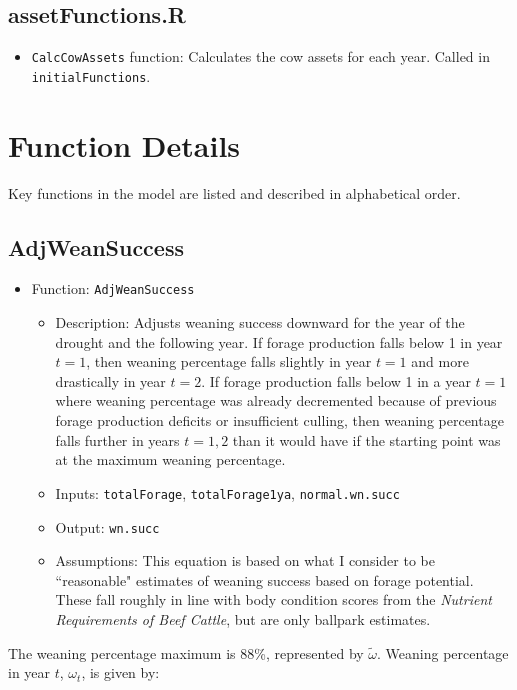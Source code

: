 \documentclass[11pt]{article}
\begin{document}
\subsection{assetFunctions.R}
\begin{itemize}
	\item \verb!CalcCowAssets! function: Calculates the cow assets for each year. Called in \verb!initialFunctions!.
\end{itemize}


\section{Function Details}
Key functions in the model are listed and described in alphabetical order.


\subsection{AdjWeanSuccess}
\begin{itemize}
\item Function: \verb!AdjWeanSuccess!
	\begin{itemize}
	\item Description: Adjusts weaning success downward for the year of the drought and the following year. If forage production falls below 1 in year $t=1$, then weaning percentage falls slightly in year $t=1$ and more drastically in year $t=2$. If forage production falls below 1 in a year $t=1$ where weaning percentage was already decremented because of previous forage production deficits or insufficient culling, then weaning percentage falls further in years $t=1,2$ than it would have if the starting point was at the maximum weaning percentage.
	\item Inputs: \verb!totalForage!, \verb!totalForage1ya!, \verb!normal.wn.succ!
	\item Output: \verb!wn.succ!
	\item Assumptions: This equation is based on what I consider to be ``reasonable" estimates of weaning success based on forage potential. These fall roughly in line with body condition scores from the \textit{Nutrient Requirements of Beef Cattle}, but are only ballpark estimates.
	\end{itemize}
\end{itemize}

The weaning percentage maximum is 88\%, represented by $\tilde{\omega}$. Weaning percentage in year $t$, $\omega_t$, is given by:\\
\end{document}
